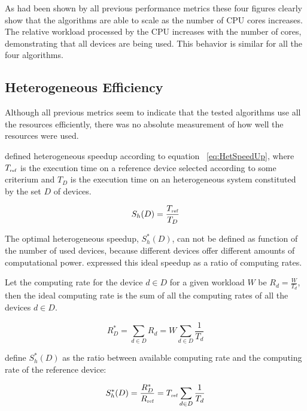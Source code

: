 As had been shown by all previous performance metrics these four figures clearly show that the algorithms are able to scale as the number of CPU cores increases. The relative workload processed by the CPU increases with the number of cores, demonstrating that all devices are being used. This behavior is similar for all the four algorithms.

\subsection{\label{sec:hefficiency} Heterogeneous Efficiency}

Although all previous metrics seem to indicate that the tested algorithms use all the resources efficiently, there was no absolute measurement of how well the resources were used.

\cite{Chamberlain98} defined heterogeneous speedup according to equation ~\ref{eq:HetSpeedUp}, where $T_{\mbox{\tiny ref}}$ is the execution time on a reference device selected according to some criterium and $T_D$ is the execution time on an heterogeneous system constituted by the set $D$ of devices.

\begin{equation}
S_h(D) = \frac{T_{\mbox{\tiny ref}}}{T_D}
\label{eq:HetSpeedUp}
\end{equation}

The optimal heterogeneous speedup, $S_h^*(D)$, can not be defined as function of the number of used devices, because different devices offer different amounts of computational power. \cite{Chamberlain98} expressed this ideal speedup as a ratio of computing rates. 

Let the computing rate for the device $d \in D$ for a given workload $W$ be $R_d = \frac{W}{T_d}$, then the ideal computing rate is the sum of all the computing rates of all the devices $d \in D$.

\begin{equation}
R^*_D = \sum_{d \in D} R_d = W \sum_{d \in D} \frac{1}{T_d}
\label{eq:StarCapacity}
\end{equation}

\cite{Chamberlain98} define $S_h^*(D)$ as the ratio between available computing rate and the computing rate of the reference device:

\begin{equation}
S^*_h(D) = \frac{R^*_D}{R_{\mbox{\tiny ref}}} = T_{\mbox{\tiny ref}} \sum_{d \in D} \frac{1}{T_d}
\label{eq:StarHetSpeedUp}
\end{equation}

